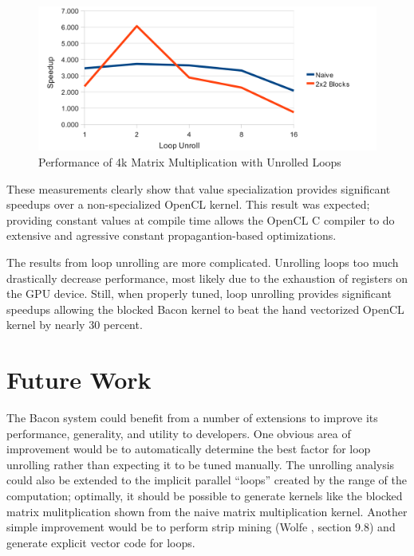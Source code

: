 \documentclass{llncs}
\begin{document}
\begin{figure}[tbh]
\begin{center}
\includegraphics[clip]{unrolling}
\end{center}
\caption{Performance of 4k Matrix Multiplication with Unrolled Loops}\label{unroll}
\end{figure}

These measurements clearly show that value specialization provides
significant speedups over a non-specialized OpenCL kernel. This result
was expected; providing constant values at compile time allows the
OpenCL C compiler to do extensive and agressive constant
propagantion-based optimizations.

The results from loop unrolling are more complicated. Unrolling loops
too much drastically decrease performance, most likely due to the
exhaustion of registers on the GPU device. Still, when properly tuned,
loop unrolling provides significant speedups allowing the blocked
Bacon kernel to beat the hand vectorized OpenCL kernel by nearly 30
percent.

\section{Future Work}

The Bacon system could benefit from a number of extensions to improve
its performance, generality, and utility to developers. One obvious
area of improvement would be to automatically determine the best
factor for loop unrolling rather than expecting it to be tuned
manually. The unrolling analysis could also be extended to the
implicit parallel ``loops'' created by the range of the computation;
optimally, it should be possible to generate kernels like the blocked
matrix mulitplication shown from the naive matrix multiplication
kernel. Another simple improvement would be to perform strip mining
(Wolfe \cite{wolfe:1996}, section 9.8) and generate explicit vector
code for loops.
\end{document}
